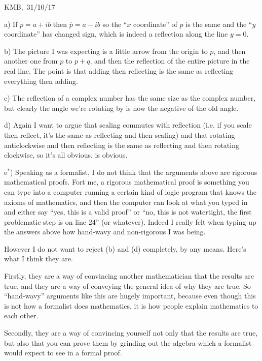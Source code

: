 \documentclass[10pt]{article}
\begin{document}
\begin{flushright} KMB,\ 31/10/17\end{flushright}


\medskip
{} 

a) If $p=a+ib$ then $\overline{p}=a-ib$ so the ``$x$ coordinate'' of $p$ is the same and the ``$y$ coordinate'' has changed sign, which is indeed a reflection along the line $y=0$.

b) The picture I was expecting is a little arrow from the origin to $p$, and then another one from $p$ to $p+q$, and then the reflection of the entire picture in the real line. The point is that adding then reflecting is the same as reflecting everything then adding.

c) The reflection of a complex number has the same size as the complex number, but clearly the angle we're rotating by is now the negative of the old angle.

d) Again I want to argue that scaling commutes with reflection (i.e. if you scale then reflect, it's the same as reflecting and then scaling) and that rotating anticlockwise and then reflecting is the same as reflecting and then rotating clockwise, so it's all obvious.
is obvious.

e${}^*$) Speaking as a formalist, I do not think that the arguments above are rigorous mathematical proofs. Fort me, a rigorous mathematical proof is something you can type into a computer running a certain kind of logic program that knows the axioms of mathematics, and then the computer can look at what you typed in and either say ``yes, this is a valid proof'' or ``no, this is not watertight, the first problematic step is on line 24'' (or whatever). Indeed I really felt when typing up the answers above how hand-wavy and non-rigorous I was being.

However I do not want to reject (b) and (d) completely, by any means. Here's what I think they are.

Firstly, they are a way of convincing another mathematician that the results are true, and they are a way of conveying the general idea of why they are true. So ``hand-wavy'' arguments like this are hugely important, because even though this is not how a formalist does mathematics, it is how people explain mathematics to each other. 

Secondly, they are a way of convincing yourself not only that the results are true, but also that you can prove them by grinding out the algebra which a formalist would expect to see in a formal proof. 
\end{document}
